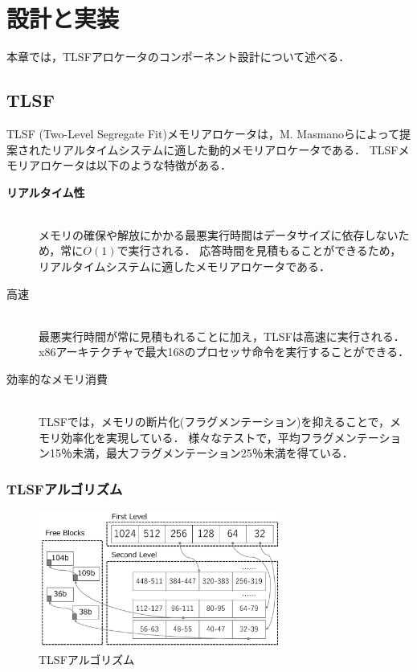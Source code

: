\documentclass[submit]{ipsj_v2/UTF8/ipsj}
\begin{document}
\section{設計と実装}
\label{sec:DesignImplementation}

本章では，TLSFアロケータのコンポーネント設計について述べる．


\subsection{TLSF}
\label{sec:TLSF}
TLSF (Two-Level Segregate Fit)メモリアロケータは，M. Masmanoらによって提案されたリアルタイムシステムに適した動的メモリアロケータである．
TLSFメモリアロケータは以下のような特徴がある．
\begin{description}
    \item[{\bf リアルタイム性}]\mbox{}\\
        メモリの確保や解放にかかる最悪実行時間はデータサイズに依存しないため，常に$O(1)$で実行される．
        応答時間を見積もることができるため，リアルタイムシステムに適したメモリアロケータである．
    \item[{高速}]\mbox{}\\
        最悪実行時間が常に見積もれることに加え，TLSFは高速に実行される．
        x86アーキテクチャで最大168のプロセッサ命令を実行することができる．
    \item[{効率的なメモリ消費}]\mbox{}\\
        TLSFでは，メモリの断片化(フラグメンテーション)を抑えることで，メモリ効率化を実現している．
        様々なテストで，平均フラグメンテーション15％未満，最大フラグメンテーション25％未満を得ている．
\end{description}

\subsubsection{TLSFアルゴリズム}


\begin{figure}[t]
    \centering
    \includegraphics[width=8cm,clip]{figure/TLSF.pdf}
    \caption{TLSFアルゴリズム}
    \label{fig:TLSF}
\end{figure}
\end{document}
